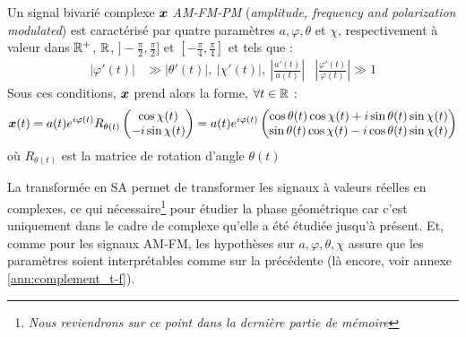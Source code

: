 \begin{definition}[Signal AM-FM-PM] \label{def:AM-FM-PM}
	Un signal bivarié complexe $\boldsymbol{x}$ \emph{AM-FM-PM} (\emph{amplitude, frequency and polarization modulated}) est caractérisé par quatre paramètres $a,\varphi,\theta$ et $\chi$, respectivement à valeur dans $\mathbb{R}^+$, $\mathbb{R}$, $]-\frac{\pi}{2}, \frac{\pi}{2}]$ et $[-\frac{\pi}{4}, \frac{\pi}{4}]$ et tels que :
	\begin{align}\label{eq:condi_AM-FM-PM}
		\big| \varphi'(t) \big| &\gg \big| \theta'(t) \big| ,\ \big| \chi'(t) \big| ,\ \left| \frac{a'(t)}{a(t)}\right|  &  \left| \frac{\varphi'(t)}{\varphi(t)}\right| \gg 1
	\end{align}
	Sous ces conditions, $\boldsymbol{x}$ prend alors la forme, $\forall t\in\mathbb{R}$ :
	\begin{equation}\label{eq:AM-FM-PM}
		\boldsymbol{x}(t) = a(t)e^{i\varphi(t)} R_{\theta(t)} \begin{pmatrix} \cos\chi(t) \\ -i\sin\chi(t) \end{pmatrix} 
		= a(t)e^{i\varphi(t)} \begin{pmatrix} \cos\theta(t) \cos\chi(t) + i\sin\theta(t) \sin\chi(t) \\ \sin\theta(t) \cos\chi(t) - i\cos\theta(t) \sin\chi(t) \end{pmatrix}
	\end{equation}
	où $R_{\theta(t)}$ est la matrice de rotation d'angle $\theta(t)$
	\\
\end{definition}
\skipl

La transformée en SA permet de transformer les signaux à valeurs réelles en complexes, ce qui nécessaire\footnote{\itshape
	Nous reviendrons sur ce point dans la dernière partie de mémoire }
pour étudier la phase géométrique car c'est uniquement dans le cadre de complexe qu'elle a été étudiée jusqu'à présent. Et, comme pour les signaux AM-FM, les hypothèses sur $a,\varphi,\theta,\chi$ assure que les paramètres soient interprétables comme sur la  précédente (là encore, voir annexe \ref{ann:complement_t-f}).
\\

